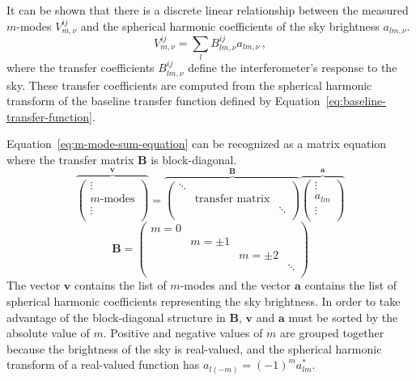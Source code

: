 \documentclass[twocolumn]{aastex61}
\renewcommand{\b}{\pmb}
\begin{document}
It can be shown that there is a discrete linear relationship between the measured $m$-modes
$V^{ij}_{m,\nu}$ and the spherical harmonic coefficients of the sky brightness $a_{lm,\nu}$.
\begin{equation}\label{eq:m-mode-sum-equation}
    V^{ij}_{m,\nu} = \sum_l B^{ij}_{lm,\nu} a_{lm,\nu}\,,
\end{equation}
where the transfer coefficients $B^{ij}_{lm,\nu}$ define the interferometer's response to the sky.
These transfer coefficients are computed from the spherical harmonic transform of the baseline
transfer function defined by Equation~\ref{eq:baseline-transfer-function}.

Equation~\ref{eq:m-mode-sum-equation} can be recognized as a matrix equation where the transfer
matrix $\b B$ is block-diagonal.
\begin{equation}\label{eq:m-mode-matrix-equation}
    \overbrace{\left(
        \begin{array}{c}
            \vdots \\
            m\text{-modes} \\
            \vdots \\
        \end{array}
    \right)}^{\b v}
    =
    \overbrace{\left(
        \begin{array}{ccc}
            \ddots & & \\
            & \text{transfer matrix} & \\
            & & \ddots \\
        \end{array}
    \right)}^{\b B}
    \overbrace{\left(
        \begin{array}{c}
            \vdots \\
            a_{lm} \\
            \vdots \\
        \end{array}
    \right)}^{\b a}
\end{equation}
\begin{equation}
    \b B = \left(\begin{array}{cccc}
        m = 0 &&& \\
              & m=\pm1 && \\
              && m=\pm2 & \\
              &&& \ddots \\
    \end{array}\right)
\end{equation}
The vector $\b v$ contains the list of $m$-modes and the vector $\b a$ contains the list of
spherical harmonic coefficients representing the sky brightness. In order to take advantage of the
block-diagonal structure in $\b B$, $\b v$ and $\b a$ must be sorted by the absolute value of $m$.
Positive and negative values of $m$ are grouped together because the brightness of the sky is
real-valued, and the spherical harmonic transform of a real-valued function has $a_{l(-m)} = (-1)^m
a_{lm}^*$.
\end{document}
